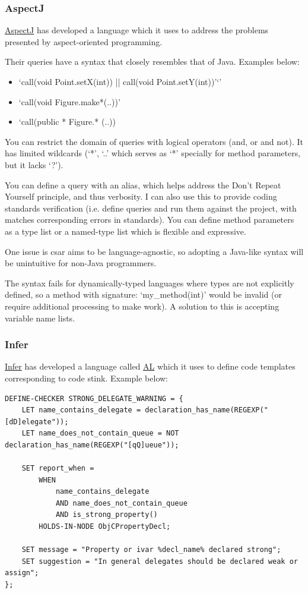 \documentclass[12pt, letterpaper]{article}
\begin{document}
\subsubsection{AspectJ}
\href{https://eclipse.org/aspectj/doc/next/progguide/starting-aspectj.html}{AspectJ} has developed a language which it uses to address the problems presented by aspect-oriented programming.  

Their queries have a syntax that closely resembles that of Java. Examples below:
\begin{itemize}
  \item `call(void Point.setX(int)) || call(void Point.setY(int))'`'
  \item `call(void Figure.make*(..))'
  \item `call(public * Figure.* (..))
\end{itemize}

You can restrict the domain of queries with logical operators (and, or and not).
It has limited wildcards (`*', `..' which serves as `*' specially for method parameters, but it lacks `?').

You can define a query with an alias, which helps address the Don't Repeat Yourself principle, and thus verbosity.
I can also use this to provide coding standards verification (i.e. define queries and run them against the project, with matches corresponding errors in standards).
You can define method parameters as a type list or a named-type list which is flexible and expressive.

One issue is csar aims to be language-agnostic, so adopting a Java-like syntax will be unintuitive for non-Java programmers.

The syntax fails for dynamically-typed languages where types are not explicitly defined, so a method with signature: `my\_method(int)' would be invalid (or require additional processing to make work).
A solution to this is accepting variable name lists.

\subsubsection{Infer}
\href{https://github.com/facebook/infer}{Infer} has developed a language called \href{https://code.facebook.com/posts/277643589367408/}{AL} which it uses to define code templates corresponding to code stink. Example below:  

\begin{lstlisting}
DEFINE-CHECKER STRONG_DELEGATE_WARNING = {
    LET name_contains_delegate = declaration_has_name(REGEXP("[dD]elegate"));
    LET name_does_not_contain_queue = NOT declaration_has_name(REGEXP("[qQ]ueue"));

    SET report_when =
        WHEN
            name_contains_delegate
            AND name_does_not_contain_queue
            AND is_strong_property()
        HOLDS-IN-NODE ObjCPropertyDecl;

    SET message = "Property or ivar %decl_name% declared strong";
    SET suggestion = "In general delegates should be declared weak or assign";
};
\end{lstlisting}
\end{document}
